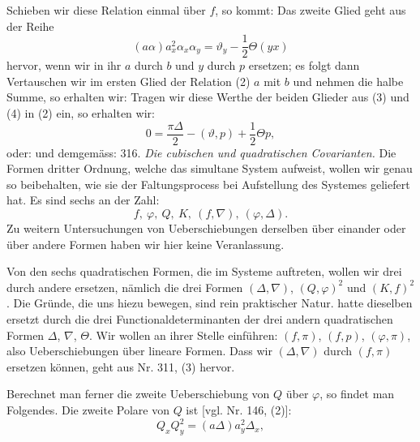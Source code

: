 Schieben wir diese Relation einmal über $f$, so kommt:
Das zweite Glied geht aus der Reihe
\[
(a\alpha)a_x^2\alpha_x\alpha_y = \vartheta_y - \frac{1}{2}\Theta(yx)
\]
hervor, wenn wir in ihr $a$ durch $b$ und $y$ durch $p$ ersetzen; es folgt dann
Vertauschen wir im ersten Glied der Relation (2) $a$ mit $b$ und nehmen die halbe Summe, so erhalten wir:
Tragen wir diese Werthe der beiden Glieder aus (3) und (4) in (2) ein, so erhalten wir:
\[
0 = \frac{\pi\Delta}{2} - (\vartheta,p) + \frac{1}{2}\Theta p,
\]
oder:
und demgemäss:
316. \textit{Die cubischen und quadratischen Covarianten.} Die Formen dritter Ordnung, welche das simultane System aufweist, wollen wir genau so beibehalten, wie sie der Faltungsprocess bei Aufstellung des Systemes geliefert hat. Es sind sechs an der Zahl:
\[
f,\ \varphi,\ Q,\ K,\ (f,\nabla),\ (\varphi,\Delta).
\]
Zu weitern Untersuchungen von Ueberschiebungen derselben über einander oder über andere Formen haben wir hier keine Veranlassung.

Von den sechs quadratischen Formen, die im Systeme auftreten, wollen wir drei durch andere ersetzen, nämlich die drei Formen $(\Delta,\nabla)$, $(Q,\varphi)^2$ und $(K,f)^2$. Die Gründe, die uns hiezu bewegen, sind rein praktischer Natur.  hatte dieselben ersetzt durch die drei Functionaldeterminanten der drei andern quadratischen Formen $\Delta$, $\nabla$, $\Theta$. Wir wollen an ihrer Stelle einführen: $(f,\pi)$, $(f,p)$, $(\varphi,\pi)$, also Ueberschiebungen über lineare Formen. Dass wir $(\Delta,\nabla)$ durch $(f,\pi)$ ersetzen können, geht aus Nr. 311, (3) hervor.

Berechnet man ferner die zweite Ueberschiebung von $Q$ über $\varphi$, so findet man Folgendes. Die zweite Polare von $Q$ ist [vgl. Nr. 146, (2)]:
\[
Q_xQ_y^2 = (a\Delta)a_y^2\Delta_x,
\]


